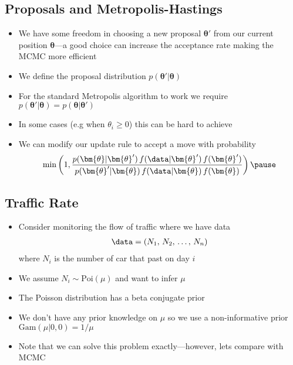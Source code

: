 \begin{slide}
\section[-2]{Proposals and Metropolis-Hastings}

\begin{PauseHighLight}
  \begin{itemize}
  \item We have some freedom in choosing a new proposal $\bm{\theta}'$
    from our current position $\bm{\theta}$---a good choice can increase
    the acceptance rate making the MCMC more efficient\pause
  \item We define the proposal distribution
    $p(\bm{\theta}'|\bm{\theta})$\pause
  \item For the standard Metropolis algorithm to work we require
    $p(\bm{\theta}'|\bm{\theta}) = p(\bm{\theta}|\bm{\theta}')$\pause
  \item In some cases (e.g when $\theta_i\geq 0$) this can be hard to
    achieve\pause
  \item We can modify our update rule to accept a move with probability
    \begin{align*}
      \min\left(1, \frac{p(\bm{\theta}|\bm{\theta}')\,f(\data|
      \bm{\theta}')\,f(\bm{\theta}')}{p(\bm{\theta}'|\bm{\theta})\,f(\data|
      \bm{\theta})\,f(\bm{\theta})}\right)\pause
    \end{align*}
  \end{itemize}
\end{PauseHighLight}

\end{slide}



\begin{slide}
\section[-2]{Traffic Rate}

\begin{PauseHighLight}
  \begin{itemize}
  \item Consider monitoring the flow of traffic where we have data
    \begin{align*}
      \data = (N_1,\,N_2,\,\ldots,\, N_n)
    \end{align*}
    where $N_i$ is the number of car that past on day $i$\pause
  \item We assume $N_i\sim\mathrm{Poi}(\mu)$ and want to infer
    $\mu$\pause
  \item The Poisson distribution has a beta conjugate prior\pause
  \item We don't have any prior knowledge on $\mu$ so we use a
    non-informative prior $\mathrm{Gam}(\mu|0,0)=1/\mu$\pause
  \item Note that we can solve this problem exactly---however, lets
    compare with MCMC\pause
  \end{itemize}
\end{PauseHighLight}

\end{slide}


